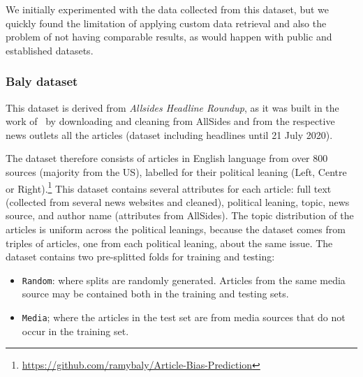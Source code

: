 We initially experimented with the data collected from this dataset, but we quickly found the limitation of applying custom data retrieval and also the problem of not having comparable results, as would happen with public and established datasets.


\subsubsection{Baly dataset}

This dataset is derived from \emph{Allsides Headline Roundup\texttrademark}, as it was built in the work of~\citet{baly2020we} by downloading and cleaning from AllSides and from the respective news outlets all the articles (dataset including headlines until 21 July 2020).

The dataset therefore 
consists of articles in English language from over 800 sources (majority from the US), labelled for their political leaning (Left, Centre or Right).\footnote{\url{https://github.com/ramybaly/Article-Bias-Prediction}}
This dataset contains several attributes for each article: full text (collected from several news websites and cleaned), political leaning, topic, news source, and author name (attributes from AllSides).
The topic distribution of the articles is uniform across the political leanings, because the dataset comes from triples of articles, one from each political leaning, about the same issue. 
The dataset contains two pre-splitted folds for training and testing:
\begin{itemize}
    \item \texttt{Random}: where splits are randomly generated. Articles from the same media source may be contained both in the training and testing sets. 
    \item \texttt{Media}; where the articles in the test set are from media sources that do not occur in the training set. %
\end{itemize}

